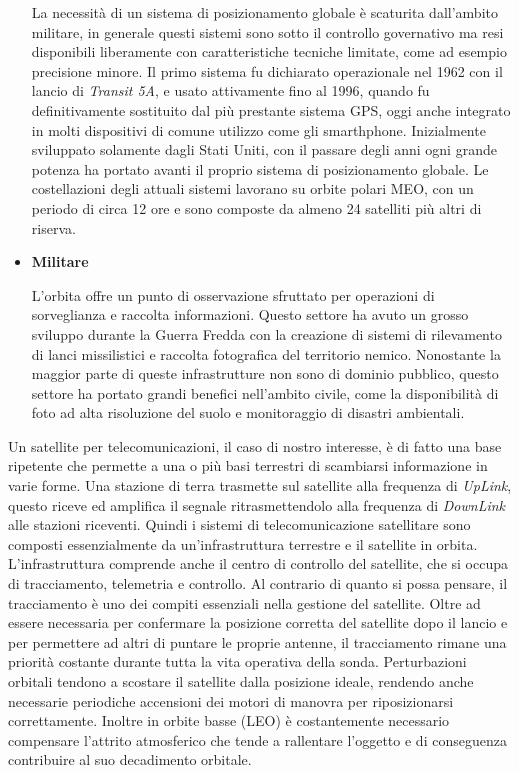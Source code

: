 \documentclass[a4paper]{article}
\begin{document}
\begin{itemize}
				La necessità di un sistema di posizionamento globale è scaturita dall'ambito militare, in generale questi sistemi sono sotto il controllo governativo ma resi disponibili liberamente con caratteristiche tecniche limitate, come ad esempio precisione minore. Il primo sistema fu dichiarato operazionale nel 1962 con il lancio di {\it Transit 5A}, e usato attivamente fino al 1996, quando fu definitivamente sostituito dal più prestante sistema GPS, oggi anche integrato in molti dispositivi di comune utilizzo come gli smarthphone. Inizialmente sviluppato solamente dagli Stati Uniti, con il passare degli anni ogni grande potenza ha portato avanti il proprio sistema di posizionamento globale. Le costellazioni degli attuali sistemi lavorano su orbite polari MEO, con un periodo di circa 12 ore e sono composte da almeno 24 satelliti più altri di riserva. 
				
				\item {\bf Militare}
				
				L'orbita offre un punto di osservazione sfruttato per operazioni di sorveglianza e raccolta informazioni. Questo settore ha avuto un grosso sviluppo durante la Guerra Fredda con la creazione di sistemi di rilevamento di lanci missilistici e raccolta fotografica del territorio nemico. Nonostante la maggior parte di queste infrastrutture non sono di dominio pubblico, questo settore ha portato grandi benefici nell'ambito civile, come la disponibilità di foto ad alta risoluzione del suolo e monitoraggio di disastri ambientali.
				
			\end{itemize}
			Un satellite per telecomunicazioni, il caso di nostro interesse, è di fatto una base ripetente che permette a una o più basi terrestri di scambiarsi informazione in varie forme. Una stazione di terra trasmette sul satellite alla frequenza di {\it UpLink}, questo riceve ed amplifica il segnale ritrasmettendolo alla frequenza di {\it DownLink} alle stazioni riceventi. Quindi i sistemi di telecomunicazione satellitare sono composti essenzialmente da un'infrastruttura terrestre e il satellite in orbita. L'infrastruttura comprende anche il centro di controllo del satellite, che si occupa di tracciamento, telemetria e controllo. Al contrario di quanto si possa pensare, il tracciamento è uno dei compiti essenziali nella gestione del satellite. Oltre ad essere necessaria per confermare la posizione corretta del satellite dopo il lancio e per permettere ad altri di puntare le proprie antenne, il tracciamento rimane una priorità costante durante tutta la vita operativa della sonda. Perturbazioni orbitali tendono a scostare il satellite dalla posizione ideale, rendendo anche necessarie periodiche accensioni dei motori di manovra per riposizionarsi correttamente. Inoltre in orbite basse (LEO) è costantemente necessario compensare l'attrito atmosferico che tende a rallentare l'oggetto e di conseguenza contribuire al suo decadimento orbitale. 
\end{document}
